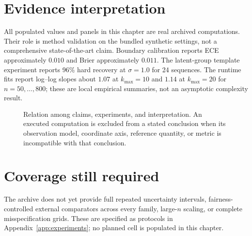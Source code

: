 \begin{table}[H]
    \centering
    
    \caption{Numerical companion for the same archived Gaussian runtime configuration as Figure~\ref{fig:runtime}. The bundled table reports the $k_{\max}=20$ configuration of panel~A rather than every curve displayed in the figure; the $k_{\max}$ sweep of panel~B is recorded in the figure's CSV sidecar.}
    \label{tab:runtime_scaling}
\end{table}


\section{Evidence interpretation}
All populated values and panels in this chapter are real archived computations. Their role is
method validation on the bundled synthetic settings, not a comprehensive state-of-the-art claim.
Boundary calibration reports ECE approximately $0.010$ and Brier approximately $0.011$. The
latent-group template experiment reports 96\% hard recovery at $\sigma=1.0$ for 24 sequences.
The runtime fits report log--log slopes about $1.07$ at $k_{\max}=10$ and $1.14$ at
$k_{\max}=20$ for $n=50,\ldots,800$; these are local empirical summaries, not an asymptotic
complexity result.

\begin{figure}[H]
\centering
\resizebox{0.96\textwidth}{!}{}
\caption{Relation among claims, experiments, and interpretation. An executed computation is excluded from a stated conclusion when its observation model, coordinate axis, reference quantity, or metric is incompatible with that conclusion.}
\label{fig:claim-experiment-map}
\end{figure}

\section{Coverage still required}
The archive does not yet provide full repeated uncertainty intervals, fairness-controlled external
comparators across every family, large-$n$ scaling, or complete misspecification grids. These are
specified as protocols in Appendix~\ref{app:experiments}; no planned cell is populated in this
chapter.
